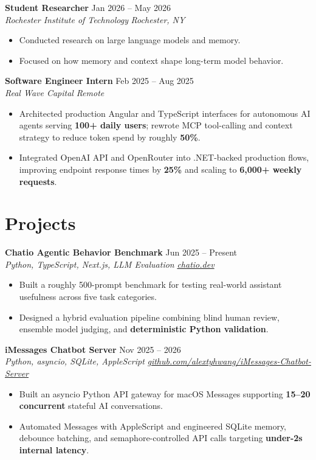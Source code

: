 \documentclass[10pt,letterpaper]{article}
\newif\ifresumeFirstRole
\newcommand{\resumeRole}[4]{%
  \ifresumeFirstRole
    \global\resumeFirstRolefalse
  \else
    \vspace{0pt plus 1fill}%
  \fi
  \textbf{#1} \hfill #2\\
  \textit{#3} \hfill \textit{#4}
}
\begin{document}
\resumeRole{Student Researcher}{Jan 2026 -- May 2026}{Rochester Institute of Technology}{Rochester, NY}
\begin{itemize}
  \item Conducted research on large language models and memory.
  \item Focused on how memory and context shape long-term model behavior.
\end{itemize}

\resumeRole{Software Engineer Intern}{Feb 2025 -- Aug 2025}{Real Wave Capital}{Remote}
\begin{itemize}
  \item Architected production Angular and TypeScript interfaces for autonomous AI agents serving \textbf{100+ daily users}; rewrote MCP tool-calling and context strategy to reduce token spend by roughly \textbf{50\%}.
  \item Integrated OpenAI API and OpenRouter into .NET-backed production flows, improving endpoint response times by \textbf{25\%} and scaling to \textbf{6,000+ weekly requests}.
\end{itemize}

\section*{Projects}
\resumeRole{Chatio Agentic Behavior Benchmark}{Jun 2025 -- Present}{Python, TypeScript, Next.js, LLM Evaluation}{\href{https://chatio.dev}{chatio.dev}}
\begin{itemize}
  \item Built a roughly 500-prompt benchmark for testing real-world assistant usefulness across five task categories.
  \item Designed a hybrid evaluation pipeline combining blind human review, ensemble model judging, and \textbf{deterministic Python validation}.
\end{itemize}

\resumeRole{iMessages Chatbot Server}{Nov 2025 -- 2026}{Python, asyncio, SQLite, AppleScript}{\href{https://github.com/alextyhwang/iMessages-Chatbot-Server}{github.com/alextyhwang/iMessages-Chatbot-Server}}
\begin{itemize}
  \item Built an asyncio Python API gateway for macOS Messages supporting \textbf{15--20 concurrent} stateful AI conversations.
  \item Automated Messages with AppleScript and engineered SQLite memory, debounce batching, and semaphore-controlled API calls targeting \textbf{under-2s internal latency}.
\end{itemize}
\end{document}
